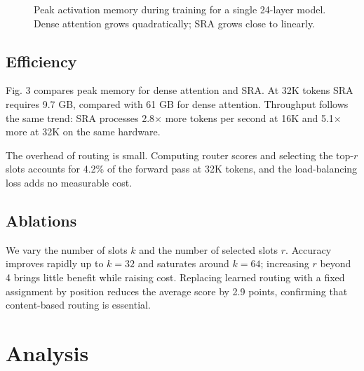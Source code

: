\documentclass[conference,letterpaper]{IEEEtran}
\begin{document}
\begin{figure}[t]
\centering
{}
\caption{Peak activation memory during training for a single 24-layer model. Dense attention grows quadratically; SRA grows close to linearly.}
\label{fig:memory}
\end{figure}

\subsection{Efficiency}

Fig. 3 compares peak memory for dense attention and SRA. At 32K tokens SRA requires 9.7 GB, compared with 61 GB for dense attention. Throughput follows the same trend: SRA processes 2.8$\times$ more tokens per second at 16K and 5.1$\times$ more at 32K on the same hardware.

The overhead of routing is small. Computing router scores and selecting the top-$r$ slots accounts for 4.2\% of the forward pass at 32K tokens, and the load-balancing loss adds no measurable cost.

\subsection{Ablations}

We vary the number of slots $k$ and the number of selected slots $r$. Accuracy improves rapidly up to $k = 32$ and saturates around $k = 64$; increasing $r$ beyond 4 brings little benefit while raising cost. Replacing learned routing with a fixed assignment by position reduces the average score by 2.9 points, confirming that content-based routing is essential.

\section{Analysis}
\end{document}
